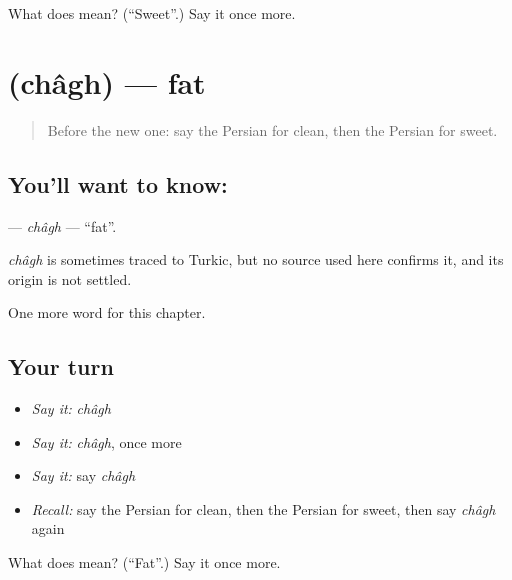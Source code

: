 \begin{tcolorbox}[breakable,colback=teal!4,colframe=teal!35!black,title={Before you move on}]
What does  mean? (\textquotedblleft{}Sweet\textquotedblright{}.) Say it once more.
\end{tcolorbox}
\section[\texorpdfstring{\fa{چاق} (châgh)}{چاق (châgh)}]{ (châgh) — fat}

\label{lesson:FA-C62-chagh}



\begin{quote}
Before the new one: say the Persian for clean, then the Persian for sweet.
\end{quote}

\subsection*{You'll want to know: }
\textbf{} — \emph{châgh} — \textquotedblleft{}fat\textquotedblright{}.

\begin{cousinweb}
\emph{châgh} is sometimes traced to Turkic, but no source used here confirms it, and its origin is not settled.
\end{cousinweb}

\begin{grammarlens}[title={What you've built}]
One more word for this chapter.
\end{grammarlens}

\subsection*{Your turn}
\begin{itemize}
\raggedright
  \item \emph{Say it:} \emph{châgh}
  \item \emph{Say it:} \emph{châgh}, once more
  \item \emph{Say it:} say \emph{châgh}
  \item \emph{Recall:} say the Persian for clean, then the Persian for sweet, then say \emph{châgh} again
\end{itemize}

\begin{tcolorbox}[breakable,colback=teal!4,colframe=teal!35!black,title={Before you move on}]
What does  mean? (\textquotedblleft{}Fat\textquotedblright{}.) Say it once more.
\end{tcolorbox}
